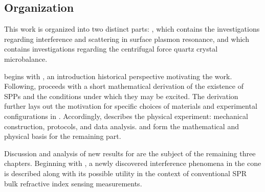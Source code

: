 %
%

\subsection*{Organization}

This work is organized into two distinct parts: , which contains
the investigations regarding interference and scattering in surface plasmon
resonance, and  which contains investigations regarding the
centrifugal force quartz crystal microbalance.

 begins with , an introduction
historical perspective motivating the work.  Following,
 proceeds with a short mathematical derivation of the
existence of SPPs and the conditions under which they may be excited.  The
derivation further lays out the motivation for specific choices of
materials and experimental configurations in .
Accordingly,  describes the physical experiment:
mechanical construction, protocols, and data analysis.
 and  form the mathematical
and physical basis for the remaining part.

Discussion and analysis of new results for  are the subject of
the remaining three chapters.  Beginning with , a
newly discovered interference phenomena in the cone is described along with its
possible utility in the context of conventional SPR bulk refractive index
sensing measurements.

